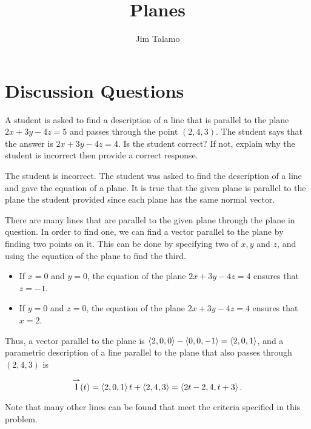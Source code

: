 \documentclass[noauthor]{ximera}
\author{Jim Talamo}
\title[Collaborate:]{Planes}
\begin{document}
\begin{abstract}
\end{abstract}
\maketitle

\section{Discussion Questions}

\begin{problem}
A student is asked to find a description of a line that is parallel to the plane $2x+3y-4z=5$ and passes through the point $(2,4,3)$.
The student says that the answer is $2x+3y-4z = 4$.  Is the student correct?  If not, explain why the student is incorrect then provide a correct response.

\begin{freeResponse}
The student is incorrect.  The student was asked to find the description of a line and gave the equation of a plane.  It is true that the given plane is parallel to the plane the student provided since each plane has the same normal vector.  

There are many lines that are parallel to the given plane through the plane in question.  In order to find one, we can find a vector parallel to the plane by finding two points on it.  This can be done by specifying two of $x,y$ and $z$, and using the equation of the plane to find the third.

\begin{itemize}
\item If $x=0$ and $y=0$, the equation of the plane $2x+3y-4z = 4$ ensures that $z=-1$.
\item If $y=0$ and $z=0$, the equation of the plane $2x+3y-4z = 4$ ensures that $x=2$.
\end{itemize}

Thus, a vector parallel to the plane is $\left\langle 2,0,0\right\rangle - \left\langle 0,0,-1\right\rangle = \left\langle 2,0,1\right\rangle$, and a parametric description of a line parallel to the plane that also passes through $(2,4,3)$ is

\[
{\overset{\boldsymbol{\rightharpoonup}}{\mathbf{l}}}(t) = \left\langle 2,0,1\right\rangle t+\left\langle 2,4,3\right\rangle = \left\langle 2t-2,4,t+3\right\rangle.
\]

Note that many other lines can be found that meet the criteria specified in this problem.

\end{freeResponse}
\end{problem}
\end{document}
